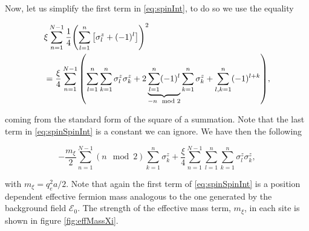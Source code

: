 Now, let us simplify the first term in \eqref{eq:spinInt}, to do so we use the equality 

\begin{align}
	&\xi \sum_{n=1}^{N-1}\frac{1}{4}\qty(\sum_{l=1}^{n}\qty[\sigma^z_l + (-1)^l])^2\nonumber\\ 
	&= \frac{\xi}{4} \sum_{n=1}^{N-1}\qty(\sum_{l=1}^{n}\sum_{k=1}^{n}\sigma^z_l\sigma^z_k + 2\underbrace{\sum_{l=1}^{n}(-1)^l}_{-n\mod2}\sum_{k=1}^{n}\sigma^z_{k} + \sum_{l,k=1}^{n}(-1)^{l+k})\label{eq:spinSpinInt},
\end{align}

coming from the standard form of the square of a summation. Note that the last term in \eqref{eq:spinSpinInt} is a constant we can ignore. We have then the following

\begin{equation}
-\frac{m_{\xi}}{2} \sum_{n=1}^{N-1}(n\mod2)\sum_{k=1}^{n}\sigma^z_{k}
+ \frac{\xi}{4} \sum_{n=1}^{N-1}\sum_{l=1}^{n}\sum_{k=1}^{n}\sigma^z_l\sigma^z_k \label{eq:ssInt2}, 
\end{equation}


with $m_\xi = q_e^2a/2 $. Note that again the first term of \eqref{eq:spinSpinInt} is a position dependent effective fermion mass analogous to the one generated by the background field $\mathcal{E}_0$. The strength of the effective mass term,  $m_{\xi}$, in each site is shown in figure \ref{fig:effMassXi}.\\

